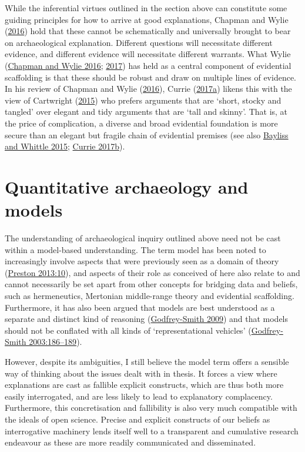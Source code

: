 \documentclass[
  12pt,
  a4paper,
  oneside]{book}
\begin{document}
While the inferential virtues outlined in the section above can constitute some guiding principles for how to arrive at good explanations, Chapman and Wylie (\protect\hyperlink{ref-chapman2016}{2016}) hold that these cannot be schematically and universally brought to bear on archaeological explanation. Different questions will necessitate different evidence, and different evidence will necessitate different warrants. What Wylie (\protect\hyperlink{ref-chapman2016}{Chapman and Wylie 2016}; \protect\hyperlink{ref-wylie2017}{2017}) has held as a central component of evidential scaffolding is that these should be robust and draw on multiple lines of evidence. In his review of Chapman and Wylie (\protect\hyperlink{ref-chapman2016}{2016}), Currie (\protect\hyperlink{ref-currie2017}{2017a}) likens this with the view of Cartwright (\protect\hyperlink{ref-cartwright2015}{2015}) who prefers arguments that are `short, stocky and tangled' over elegant and tidy arguments that are `tall and skinny'. That is, at the price of complication, a diverse and broad evidential foundation is more secure than an elegant but fragile chain of evidential premises (see also \protect\hyperlink{ref-bayliss2015}{Bayliss and Whittle 2015}; \protect\hyperlink{ref-currie2017a}{Currie 2017b}).

\hypertarget{quantitative-archaeology-and-models}{%
\section{Quantitative archaeology and models}\label{quantitative-archaeology-and-models}}

The understanding of archaeological inquiry outlined above need not be cast within a model-based understanding. The term model has been noted to increasingly involve aspects that were previously seen as a domain of theory (\protect\hyperlink{ref-preston2013}{Preston 2013:10}), and aspects of their role as conceived of here also relate to and cannot necessarily be set apart from other concepts for bridging data and beliefs, such as hermeneutics, Mertonian middle-range theory and evidential scaffolding. Furthermore, it has also been argued that models are best understood as a separate and distinct kind of reasoning (\protect\hyperlink{ref-godfrey-smith2009}{Godfrey-Smith 2009}) and that models should not be conflated with all kinds of `representational vehicles' (\protect\hyperlink{ref-godfrey-smith2003}{Godfrey-Smith 2003:186--189}).

However, despite its ambiguities, I still believe the model term offers a sensible way of thinking about the issues dealt with in thesis. It forces a view where explanations are cast as fallible explicit constructs, which are thus both more easily interrogated, and are less likely to lead to explanatory complacency. Furthermore, this concretisation and fallibility is also very much compatible with the ideals of open science. Precise and explicit constructs of our beliefs as interrogative machinery lends itself well to a transparent and cumulative research endeavour as these are more readily communicated and disseminated.
\end{document}

